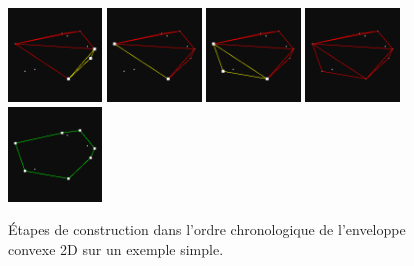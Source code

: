 \documentclass[]{article}
\begin{document}
\begin{figure}[H]
	\includegraphics[width=2.5cm]{qh2d/demo2d/frame8.png}
	\includegraphics[width=2.5cm]{qh2d/demo2d/frame9.png}
	\includegraphics[width=2.5cm]{qh2d/demo2d/frame10.png}
	\includegraphics[width=2.5cm]{qh2d/demo2d/frame11.png}
	\includegraphics[width=2.5cm]{qh2d/demo2d/frame12.png}
	\caption{Étapes de construction dans l'ordre chronologique de l'enveloppe convexe 2D sur un exemple simple.}
\end{figure}
\end{document}
